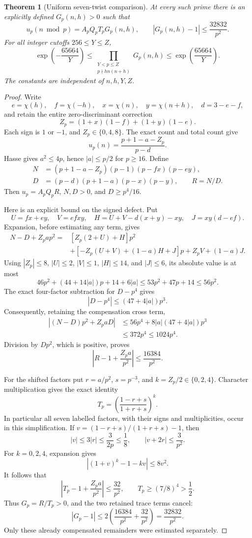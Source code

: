 \documentclass[11pt]{article}
\newtheorem{theorem}{Theorem}[section]
\begin{document}
\begin{theorem}[Uniform seven-twist comparison]
\label{thm:sevenTwistComparison}
At every such prime there is an explicitly defined \(G_p(n,h)>0\)
such that
\[
 u_p(n\bmod p)=A_pQ_pT_pG_p(n,h),\qquad
 |G_p(n,h)-1|\leq\frac{32832}{p^2}.
\]
For all integer cutoffs \(256\leq Y\leq Z\),
\[
 \exp\left(-\frac{65664}{Y}\right)
 \leq
 \prod_{\substack{Y<p\leq Z\\p\nmid hn(n+h)}}G_p(n,h)
 \leq
 \exp\left(\frac{65664}{Y}\right).
\]
The constants are independent of \(n,h,Y,Z\).
\end{theorem}
\begin{proof}
Write
\[
 e=\chi(h),\quad f=\chi(-h),\quad x=\chi(n),\quad y=\chi(n+h),
 \quad d=3-e-f,
\]
and retain the entire zero-discriminant correction
\[
 Z_p=(1+x)(1-f)+(1+y)(1-e).
\]
Each sign is \(1\) or \(-1\), and \(Z_p\in\{0,4,8\}\).
The exact count and total count give
\[
 u_p(n)=\frac{p+1-a-Z_p}{p-d}.
\]
Hasse gives \(a^2\leq4p\), hence \(|a|\leq p/2\) for \(p\geq16\).
Define
\begin{align*}
 N&=(p+1-a-Z_p)(p-1)(p-fx)(p-ey),\\
 D&=(p-d)(p+1-a)(p-x)(p-y),\qquad R=N/D.
\end{align*}
Then \(u_p=A_pQ_pR\), \(N,D>0\), and \(D\geq p^4/16\).

Here is an explicit bound on the signed defect. Put
\[
 U=fx+ey,\quad V=efxy,\quad
 H=U+V-d(x+y)-xy,\quad J=xy(d-ef).
\]
Expansion, before estimating any term, gives
\begin{align*}
 N-D+Z_pa p^2
  ={}&[Z_p(2+U)+H]p^2\\
    &+[-Z_p(U+V)+(1-a)H+J]p+Z_pV+(1-a)J.
\end{align*}
Using \(|Z_p|\leq8\), \(|U|\leq2\), \(|V|\leq1\),
\(|H|\leq14\), and \(|J|\leq6\), its absolute value is at most
\[
 46p^2+(44+14|a|)p+14+6|a|
 \leq53p^2+47p+14\leq56p^2.
\]
The exact four-factor subtraction for \(D-p^4\) gives
\[
 |D-p^4|\leq(47+4|a|)p^3.
\]
Consequently, retaining the compensation cross term,
\begin{align*}
 |(N-D)p^2+Z_paD|
 &\leq56p^4+8|a|(47+4|a|)p^3\\
 &\leq372p^4\leq1024p^4.
\end{align*}
Division by \(Dp^2\), which is positive, proves
\[
 \left|R-1+\frac{Z_pa}{p^2}\right|\leq\frac{16384}{p^2}.
\]

For the shifted factors put \(r=a/p^2\), \(s=p^{-3}\), and
\(k=Z_p/2\in\{0,2,4\}\). Character multiplication gives the exact identity
\[
 T_p=\left(\frac{1-r+s}{1+r+s}\right)^k.
\]
In particular all seven labelled factors, with their signs and
multiplicities, occur in this simplification.
If \(v=(1-r+s)/(1+r+s)-1\), then
\[
 |v|\leq3|r|\leq\frac{3}{2p}\leq\frac18,\qquad
 |v+2r|\leq\frac3{p^2}.
\]
For \(k=0,2,4\), expansion gives
\[
 |(1+v)^k-1-kv|\leq8v^2.
\]
It follows that
\[
 \left|T_p-1+\frac{Z_pa}{p^2}\right|\leq\frac{32}{p^2},
 \qquad T_p\geq(7/8)^4>\frac12.
\]
Thus \(G_p=R/T_p>0\), and the two retained trace terms cancel:
\[
 |G_p-1|\leq
 2\left(\frac{16384}{p^2}+\frac{32}{p^2}\right)
 =\frac{32832}{p^2}.
\]
Only these already compensated remainders were estimated separately.


\end{proof}
\end{document}
